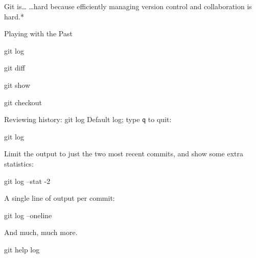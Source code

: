 \begin{frame}{Git is\ldots}
  \hangindent=30pt \Huge {
  \ldots hard because efficiently managing version control and collaboration is
  hard.*
  }
\end{frame}

\begin{frame}[fragile]{Playing with the Past}
  \begin{gitCommand}git log\end{gitCommand}
  \begin{gitCommand}git diff\end{gitCommand}
  \begin{gitCommand}git show\end{gitCommand}
  \begin{gitCommand}git checkout\end{gitCommand}
\end{frame}

\begin{frame}[fragile]{Reviewing history: git log}
  Default log; type \texttt{q} to quit:

  \begin{gitCommand}git log\end{gitCommand}

  Limit the output to just the two most recent commits, and show some extra
  statistics:

  \begin{gitCommand}git log --stat -2\end{gitCommand}

  A single line of output per commit:

  \begin{gitCommand}git log --oneline\end{gitCommand}

  And much, much more.

  \begin{gitCommand}git help log\end{gitCommand}
\end{frame}

